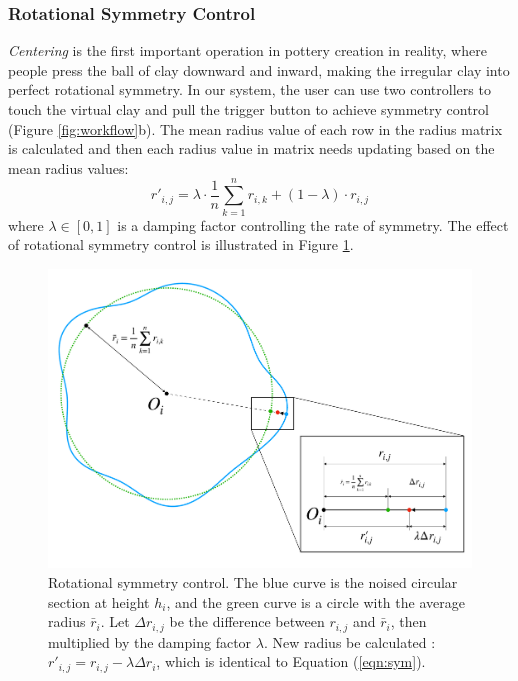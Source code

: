 \documentclass{svjour3}                     %
\begin{document}
\subsubsection{Rotational Symmetry Control}
\label{sec:4.2.1}
\textit{Centering} is the first important operation in pottery creation in reality, where people press the ball of clay downward and inward, making the irregular clay into perfect rotational symmetry.
In our system, the user can use two controllers to touch the virtual clay and pull the trigger button to achieve symmetry control (Figure \ref{fig:workflow}b).
The mean radius value of each row in the radius matrix is calculated and then each radius value in matrix needs updating based on the mean radius values:
\begin{equation}
\label{eqn:sym}
r'_{i,j} = 
\lambda \cdot \frac{1}{n}\sum_{k=1}^{n} r_{i,k}
+ (1 - \lambda) \cdot r_{i,j}
\end{equation}
where $\lambda \in [0,1]$ is a damping factor controlling the rate of symmetry.
The effect of rotational symmetry control is illustrated in Figure \ref{fig:symmetry}.

\begin{figure}
\includegraphics[width=\textwidth]{fig7.pdf}
\caption{Rotational symmetry control. The blue curve is the noised circular section at height $h_{i}$, and the green curve is a circle with the average radius $\bar r_{i}$. Let $\Delta r_{i,j}$ be the difference between $r_{i,j}$ and $\bar r_{i}$, then multiplied by the damping factor $\lambda$. New radius be calculated : $r'_{i, j} = r_{i,j} - \lambda\Delta r_{i}$, which is identical to Equation (\ref{eqn:sym}). }
\label{fig:symmetry}
\end{figure}
\end{document}
